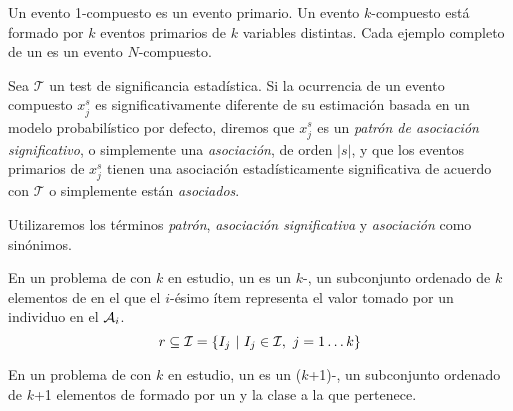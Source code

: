 Un evento 1-compuesto es un evento primario. Un evento $k$-compuesto está formado por $k$ eventos primarios de $k$ variables distintas. Cada ejemplo completo de un \dataset es un evento $N$-compuesto.

\begin{defn}
   Sea $\mathcal{T}$ un test de significancia estadística. Si la ocurrencia de un evento compuesto $x_j^s$ es significativamente diferente de su estimación basada en un modelo probabilístico por defecto, diremos que $x_j^s$ es un \emph{patrón de asociación significativo}, o simplemente una \emph{asociación}, de orden $|s|$, y que los eventos primarios de $x_j^s$ tienen una asociación estadísticamente significativa de acuerdo con $\mathcal{T}$ o simplemente están \emph{asociados}.
\label{def:patron-de-asociación-significativo}
\end{defn}



Utilizaremos los términos \emph{patrón}, \emph{asociación significativa} y \emph{asociación} como sinónimos.




\clearpage












\begin{defn}[\Registro]
   En un problema de \Clasificacion con $k$ \atributos en estudio, un \registro \reg es un $k$-\itemset, un subconjunto ordenado de $k$ elementos de \I en el que el $i$-ésimo ítem representa el valor tomado por un individuo en el \atributo $\A_i$.
   \begin{equation}\label{eq:def-registro}
     \reg \subseteq \I = \left\{I_j\ | \ I_j \in \I,\ j = 1 \ldots k\right\}
   \end{equation}
\label{def:registro}
\end{defn}

\begin{defn}[\RegClas]
   En un problema de \Clasificacion con $k$ \atributos en estudio, un \RegClas es un ($k$+1)-\itemset, un subconjunto ordenado de $k$+1 elementos de \I formado por un \registro y la clase a la que pertenece.
\label{def:registro-clasificado}
\end{defn}


